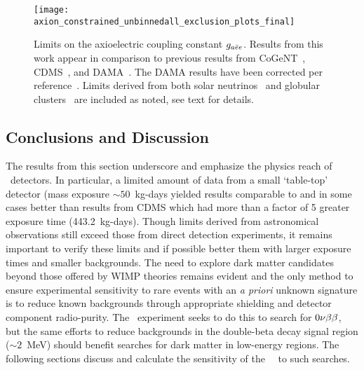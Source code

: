 		\begin{figure}
			\centering
			\texttt{[image: axion\_constrained\_unbinnedall\_exclusion\_plots\_final]}
			\caption[Limits on the axioelectric coupling constant $\gaa$]{Limits on the axioelectric 
			coupling constant $\gaa$.  Results from this work appear in comparison to previous 
			results from CoGeNT~\cite{Aalseth:2008aa}, CDMS~\cite{Ahmed2009}, and 
			DAMA~\cite{Bernabei:2005ca}.  The DAMA results have been corrected per 
			reference~\cite{Collar:2009sp}.  Limits derived from both solar neutrinos~\cite{Gondolo09} and globular clusters~\cite{Raffelt95} are included as noted, see text for details.}
			\label{fig:HeavyAxionLimits}
		\end{figure}
		
	\subsection{Conclusions and Discussion}
	\label{sec:DiscOnHeavyAxionLimits}	

	
	The results from this section underscore and emphasize the physics reach of \ppc~detectors.  In particular, a limited amount of data from a small `table-top' detector (mass exposure $\sim50$~kg-days yielded results comparable to and in some cases better than results from CDMS which had more than a factor of 5 greater exposure time (443.2~kg-days).  Though limits derived from astronomical observations still exceed those from direct detection experiments, it remains important to verify these limits and if possible better them with larger exposure times and smaller backgrounds.  The need to explore dark matter candidates beyond those offered by WIMP theories remains evident and the only method to ensure experimental sensitivity to rare events with an \emph{a priori} unknown signature is to reduce known backgrounds through appropriate shielding and detector component radio-purity.  The \MJ~experiment seeks to do this to search for $0 \nu \beta \beta$, but the same efforts to reduce backgrounds in the double-beta decay signal region ($\sim2$~MeV) should benefit searches for dark matter in low-energy regions.  The following sections discuss and calculate the sensitivity of the \MJ~\minmod~to such searches.
							
